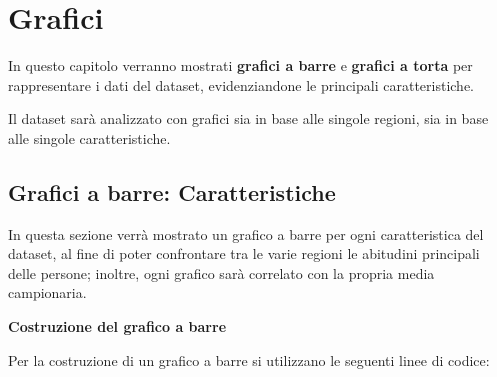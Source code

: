 {}



\chapter{Grafici}\label{cap2} %

In questo capitolo verranno mostrati \textbf{grafici a barre} e \textbf{grafici a torta} per rappresentare i dati del dataset, evidenziandone le principali caratteristiche.

Il dataset sarà analizzato con grafici sia in base alle singole regioni, sia in base alle singole caratteristiche.

\section{Grafici a barre: Caratteristiche}\label{cap2.1}

In questa sezione verrà mostrato un grafico a barre per ogni caratteristica del dataset, al fine di poter confrontare tra le varie regioni le abitudini principali delle persone; inoltre, ogni grafico sarà correlato con la propria media campionaria.

\vspace{5mm}
\noindent \textbf{Costruzione del grafico a barre}

Per la costruzione di un grafico a barre si utilizzano le seguenti linee di codice:

